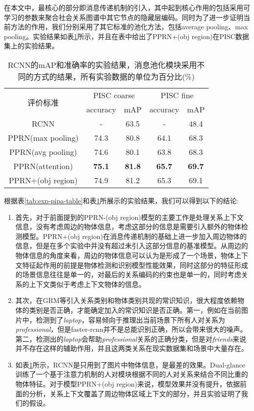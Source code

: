 在本文中，最核心的部分即消息传递机制的引入，其中起到核心作用的包括采用可学习的参数来聚合社会关系图谱中其它节点的隐藏层编码。同时为了进一步证明当前方法的作用，我们分别采用了其它标准的池化方法，包括average pooling、max pooling。实验结果如表\ref{tab:exp-mp-variant}所示，并且在表中给出了PPRN+(obj region)在PISC数据集上的实验结果。
\begin{table}[htb]
	\vspace*{-3.5pt}
	\centering
	\caption{RCNN的mAP和准确率的实验结果，消息池化模块采用不同的方式的结果，所有实验数据的单位为百分比(\%)}
    \label{tab:exp-mp-variant}
	\vspace*{-0.1cm}
	\begin{tabular}{c|c|c|c|c}
		\toprule
		\multirow{2}{*}{评价标准} &
		\multicolumn{2}{c|}{PISC coarse} &
		\multicolumn{2}{|c}{PISC fine}  \\
				 & accuracy & mAP & accuracy & mAP  \\
		\midrule
		RCNN & - & 63.5 & - & 48.4 \\
		\midrule
		PPRN(max pooling) & 74.3 & 80.8 & 64.1 & 68.3 \\
		\midrule
		PPRN(avg pooling) & 74.6 & 80.1 & 63.8 & 68.3 \\
		\midrule
		PPRN(attention) & \textbf{75.1} & \textbf{81.8} & \textbf{65.7} & \textbf{69.7} \\
		\midrule
		PPRN+(obj region) & 74.9 & 81.2 & 65.3 & 69.1 \\
		\midrule
	\end{tabular}
\end{table}

根据表\ref{tab:exp-pipa-table}和表\ref{tab:exp-mp-variant}所展示的实验结果，我们可以得到以下的结论:
\begin{enumerate}
    \item 首先，对于前面提到的PPRN-(obj region)模型的主要工作是处理关系上下文信息，没有考虑周边的物体信息，考虑这部分的信息是需要引入额外的物体检测模型。PPRN+(obj region)在消息传递机制的基础上进一步加入周边物体的信息，但是在多个实验中并没有超过未引入这部分信息的基准模型。从周边的物体信息的角度来看，周边的物体信息可以认为是形成了一个场景，物体上下文特征起作用的前提是物体检测和识别模型性能效果，同时这部分的特征形成的场景信息往往是单一的，对最后的关系编码的约束也是单一的，同时考虑关系的上下文类似于考虑上下文物体的信息。
    \item 其次，在GRM等引入关系类别和物体类别共现的常识知识，很大程度依赖物体的类别是否正确，才能确定加入的常识知识是否正确。第一，例如在当前图片中，检测到了{\it laptop}，容易倾向于推理出当前场景下所有人对关系为{\it professional}，但是faster-rcnn并不是总能识别正确，所以会带来很大的噪声。第二，检测出的{\it laptop}会帮助{\it professional}关系的正确分类，但是对{\it friends}来说并不存在这样的辅助作用，并且这两类关系在现实数据集和场景中大量存在。
    \item 如表\ref{tab:exp-mp-variant}所示，RCNN是只用到了图片中物体信息，是最差的效果。Dual-glance训练了一个基于注意力机制的人对模块根据不同的人对关系来结合不同比重的物体特征。对于模型PPRN+(obj region)来说，模型效果并没有提升，依据前面的分析，关系上下文覆盖了周边物体区域上下文的部分，并且实验证明了我们的假设。
\end{enumerate}

